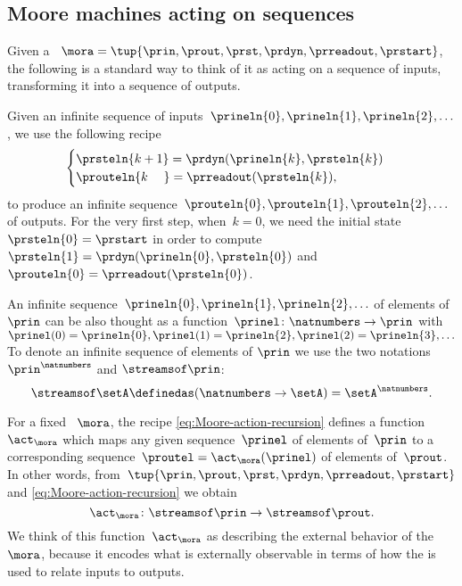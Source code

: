 \subsection{Moore machines acting on sequences}

Given a ~$\mora = \tup{\prin, \prout, \prst, \prdyn, \prreadout, \prstart}$, the following is a standard way to think of it as acting on a sequence of inputs, transforming it into a sequence of outputs.

Given an infinite sequence of inputs~$\prineln{0}, \prineln{1}, \prineln{2}, \ldots $, we use the following recipe
\begin{equation}
    \label{eq:Moore-action-recursion}
    \begin{cases}
        \prsteln{k+1} = \prdyn(\prineln{k}, \prsteln{k}) \\
        \prouteln{k\phantom{+1}}   = \prreadout(\prsteln{k}),
    \end{cases}
\end{equation}
to produce an infinite sequence~$\prouteln{0}, \prouteln{1}, \prouteln{2}, \ldots$ of outputs.
For the very first step, when~$k = 0$, we need the initial state~$\prsteln{0} = \prstart$ in order to compute~$\prsteln{1} = \prdyn(\prineln{0}, \prsteln{0})$ and~$\prouteln{0} = \prreadout(\prsteln{0})$.


An infinite sequence~$\prineln{0}, \prineln{1}, \prineln{2}, \ldots$ of elements of~$\prin$ can be also thought as a function~$\prinel \colon \natnumbers \to \prin$ with~$\prinel(0) = \prineln{0}, \prinel(1) = \prineln{2}, \prinel(2) = \prineln{3}, \ldots$ \etc
To denote an infinite sequence of elements of $\prin$ we use the two notations $\prin^{\natnumbers}$ and $\streamsof\prin$:
\begin{equation}
    \streamsof \setA \definedas  (\natnumbers \to \setA) = \setA^{\natnumbers}.
\end{equation}

For a fixed ~$\mora$, the recipe \cref{eq:Moore-action-recursion} defines a function~$\act_\mora$ which maps any given sequence~$\prinel$ of elements of~$\prin$ to a corresponding sequence~$\proutel = \act_\mora(\prinel)$ of elements of~$\prout$.
In other words, from~$\tup{\prin, \prout, \prst, \prdyn, \prreadout, \prstart}$ and \cref{eq:Moore-action-recursion} we obtain
\begin{equation}
    \act_\mora \colon \streamsof\prin  \to \streamsof\prout.
\end{equation}
We think of this function~$\act_\mora$ as describing the external behavior of the ~$\mora$, because it encodes what is externally observable in terms of how the  is used to relate inputs to outputs.

